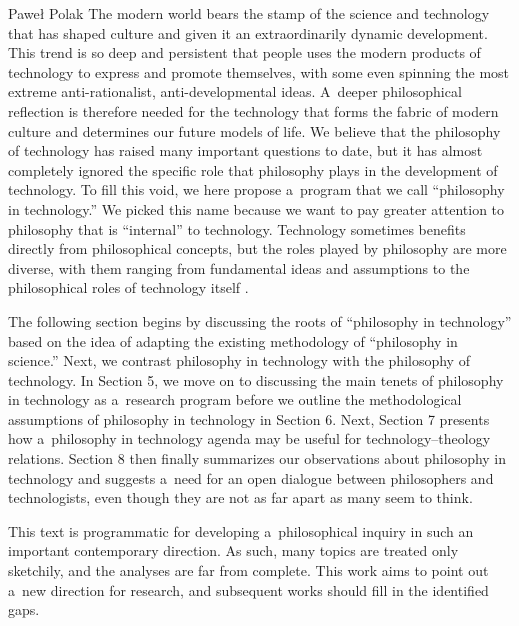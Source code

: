 \begin{artengenv}{Paweł Polak}
\lettrine[loversize=0.13,lines=2,lraise=-0.03,nindent=0em,findent=0.2pt]%
{T}{}he modern world bears the stamp of the science and technology that has shaped culture and given it an extraordinarily dynamic development. This trend is so deep and persistent that people uses the modern products of technology to express and promote themselves, with some even spinning the most extreme anti-rationalist, anti-developmental ideas. A~deeper philosophical reflection is therefore needed for the technology that forms the fabric of modern culture and determines our future models of life. We believe that the philosophy of technology has raised many important questions to date, but it has almost completely ignored the specific role that philosophy plays in the development of technology. To fill this void, we here propose a~program that we call ``philosophy in technology.'' We picked this name because we want to pay greater attention to philosophy that is ``internal'' to technology. Technology sometimes benefits directly from philosophical concepts, but the roles played by philosophy are more diverse, with them ranging from fundamental ideas and assumptions to the philosophical roles of technology itself 
\parencite[for more on the metaphysical roles of technology see, for example,][]{Bolter1984TuringsMan}.%




The following section begins by discussing the roots of ``philosophy in technology'' based on the idea of adapting the existing methodology of ``philosophy in science.'' Next, we contrast philosophy in technology with the philosophy of technology. In Section 5, we move on to discussing the main tenets of philosophy in technology as a~research program before we outline the methodological assumptions of philosophy in technology in Section 6. Next, Section 7 presents how a~philosophy in technology agenda may be useful for technology–theology relations. Section 8 then finally summarizes our observations about philosophy in technology and suggests a~need for an open dialogue between philosophers and technologists, even though they are not as far apart as many seem to think.



This text is programmatic for developing a~philosophical inquiry in such an important contemporary direction. As such, many topics are treated only sketchily, and the analyses are far from complete. This work aims to point out a~new direction for research, and subsequent works should fill in the identified gaps.




\end{artengenv}
